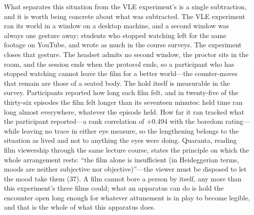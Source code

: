 What separates this situation from the VLE experiment's is a single subtraction, and it
is worth being concrete about what was subtracted. The VLE experiment ran its world in a
window on a desktop machine, and a second window was always one gesture away; students who
stopped watching left for the same footage on YouTube, and wrote as much in the course surveys.
The experiment closes that gesture. The headset admits no second window, the proctor sits in
the room, and the session ends when the protocol ends, so a participant who has stopped
watching cannot leave the film for a better world---the counter-moves that remain are those of
a seated body. The hold itself is measurable in the survey. Participants reported how long each
film felt, and in twenty-five of the thirty-six episodes the film felt longer than its
seventeen minutes: held time ran long almost everywhere, whatever the episode held. How far it
ran tracked what the participant reported---a rank correlation of $+$0.494 with the boredom
rating---while leaving no trace in either eye measure, so the lengthening belongs to the
situation as lived and not to anything the eyes were doing. Quaranta, reading film viewership
through the same lecture course, states the principle on which the whole arrangement rests:
``the film alone is insufficient (in Heideggerian terms, moods are neither subjective nor
objective)''---the viewer must be disposed to let the mood take them (37). A film cannot bore a
person by itself, any more than this experiment's three films could; what an apparatus can do
is hold the encounter open long enough for whatever attunement is in play to become legible,
and that is the whole of what this apparatus does.


